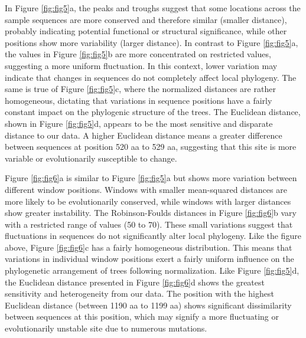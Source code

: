 In Figure \ref{fig:fig5}a, the peaks and troughs suggest that some locations across the sample sequences are more conserved and therefore similar (smaller distance), probably indicating potential functional or structural significance, while other positions show more variability (larger distance). In contrast to Figure \ref{fig:fig5}a, the values in Figure \ref{fig:fig5}b are more concentrated on restricted values, suggesting a more uniform fluctuation. In this context, lower variation may indicate that changes in sequences do not completely affect local phylogeny. The same is true of Figure \ref{fig:fig5}c, where the normalized distances are rather homogeneous, dictating that variations in sequence positions have a fairly constant impact on the phylogenic structure of the trees. The Euclidean distance, shown in Figure \ref{fig:fig5}d, appears to be the most sensitive and disparate distance to our data. A higher Euclidean distance means a greater difference between sequences at position 520 aa to 529 aa, suggesting that this site is more variable or evolutionarily susceptible to change.

Figure \ref{fig:fig6}a is similar to Figure \ref{fig:fig5}a but shows more variation between different window positions. Windows with smaller mean-squared distances are more likely to be evolutionarily conserved, while windows with larger distances show greater instability. The Robinson-Foulds distances in Figure \ref{fig:fig6}b vary with a restricted range of values (50 to 70). These small variations suggest that fluctuations in sequences do not significantly alter local phylogeny. Like the figure above, Figure \ref{fig:fig6}c has a fairly homogeneous distribution. This means that variations in individual window positions exert a fairly uniform influence on the phylogenetic arrangement of trees following normalization. Like Figure \ref{fig:fig5}d, the Euclidean distance presented in Figure \ref{fig:fig6}d shows the greatest sensitivity and heterogeneity from our data. The position with the highest Euclidean distance (between 1190 aa to 1199 aa) shows significant dissimilarity between sequences at this position, which may signify a more fluctuating or evolutionarily unstable site due to numerous mutations.
